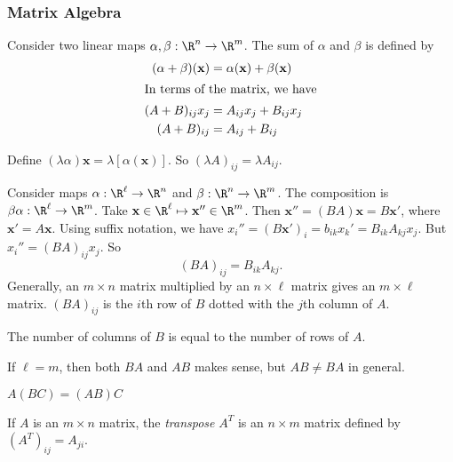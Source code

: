 \documentclass[a4paper]{article}
\begin{document}
\subsubsection{Matrix Algebra}
\begin{defi} Consider two linear maps $\alpha, \beta: \R^n\to \R^m$. The sum of $\alpha$ and $\beta$ is defined by
  \begin{align*}
    (\alpha + \beta)(\mathbf{x}) &= \alpha(\mathbf{x}) + \beta(\mathbf{x})\\
    \intertext{In terms of the matrix, we have}
    (A + B)_{ij}x_j &= A_{ij}x_j + B_{ij}x_j\\
    (A + B)_{ij} &= A_{ij}+B_{ij}
  \end{align*}
\end{defi}

\begin{defi}
  Define $(\lambda\alpha)\mathbf{x} = \lambda[\alpha(\mathbf{x})]$. So $(\lambda A)_{ij} = \lambda A_{ij}$.
\end{defi}

\begin{defi}
  Consider maps $\alpha: \R^\ell \to \R^n$  and $\beta: \R^n\to \R^m$. The composition is $\beta\alpha:\R^\ell\to\R^m$. Take $\mathbf{x}\in \R^\ell\mapsto \mathbf{x}''\in \R^m$. Then $\mathbf{x}'' = (BA)\mathbf{x} = B\mathbf{x'}$, where $\mathbf{x}' = A\mathbf{x}$. Using suffix notation, we have $x_i'' = (B\mathbf{x}')_i = b_{ik}x_k' = B_{ik}A_{kj}x_j$. But $x_i'' = (BA)_{ij}x_j$. So 
  \[
    (BA)_{ij} = B_{ik}A_{kj}.
  \]
  Generally, an $m\times n$ matrix multiplied by an $n\times \ell$ matrix gives an $m\times\ell$ matrix. $(BA)_{ij}$ is the $i$th row of $B$ dotted with the $j$th column of $A$.
\end{defi}
\note The number of columns of $B$ is equal to the number of rows of $A$.

\note If $\ell = m$, then both $BA$ and $AB$ makes sense, but $AB\not= BA$ in general.

\note $A(BC) = (AB)C$

\begin{defi}
  If $A$ is an $m\times n$ matrix, the \emph{transpose} $A^T$ is an $n\times m$ matrix defined by $(A^T)_{ij} = A_{ji}$.
\end{defi}
\end{document}
